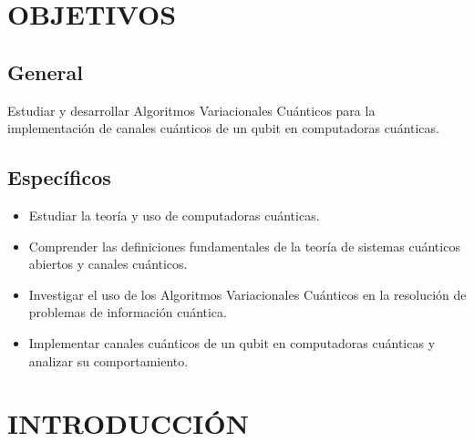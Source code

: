 \documentclass[letterpaper,12pt]{thesisECFM}
\theoremstyle{plain}
\theoremstyle{definition}
\theoremstyle{definition}
\theoremstyle{remark}
\newcommand{\1}{\mathbb{1}}
\begin{document}
\chapter*{OBJETIVOS} %
{}
\section*{General} 
Estudiar y desarrollar Algoritmos Variacionales Cuánticos para la implementación de canales cuánticos de un  qubit en computadoras cuánticas.

\section*{Específicos}
\begin{itemize}
    \item Estudiar la teoría y uso de computadoras cuánticas.
    \item Comprender las definiciones fundamentales de la teoría de sistemas cuánticos abiertos y canales cuánticos.
    \item Investigar el uso de los Algoritmos Variacionales Cuánticos en la resolución de problemas de información cuántica.
    \item Implementar canales cuánticos de un qubit en computadoras cuánticas y analizar su comportamiento.
\end{itemize}

\chapter*{INTRODUCCIÓN} %

\end{document}

